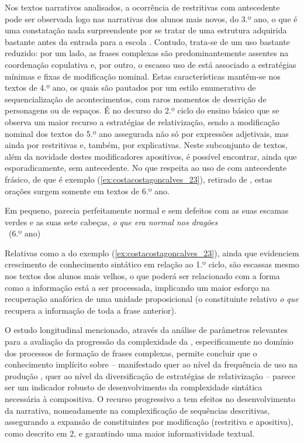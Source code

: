 \documentclass[output=paper]{LSP/langsci}
\begin{document}
Nos textos narrativos analisados, a ocorrência de  restritivas com antecedente pode ser observada logo nas narrativas dos alunos mais novos, do 3.º ano, o que é uma constatação nada surpreendente por se tratar de uma estrutura adquirida bastante antes da entrada para a escola \citep{vasconcelos1996}. Contudo, trata-se de um uso bastante reduzido: por um lado, as frases complexas são predominantemente assentes na coordenação copulativa e, por outro, o escasso uso de  está associado a estratégias mínimas e fixas de modificação nominal. Estas características mantêm-se nos textos de 4.º ano, os quais são pautados por um estilo enumerativo de sequencialização de acontecimentos, com raros momentos de descrição de personagens ou de espaços. É no decurso do 2.º ciclo do ensino básico que se observa um maior recurso a estratégias de relativização, sendo a modificação nominal dos textos do 5.º ano assegurada não só por expressões adjetivais, mas ainda por  restritivas e, também, por explicativas. Neste subconjunto de textos, além da novidade destes modificadores apositivos, é possível encontrar, ainda que esporadicamente,  sem antecedente. No que respeita ao uso de  com antecedente frásico, de que é exemplo (\ref{ex:costacostagoncalves_23}), retirado de \citet[310]{costagoncalves2010}, estas orações surgem somente em textos de 6.º ano.

\ea\label{ex:costacostagoncalves_23} 	Em pequeno, parecia perfeitamente normal e sem defeitos com as suas escamas verdes e as suas sete cabeças, \textit{o que era normal nos dragões}\\~\hfill(6.º ano)\z

Relativas como a do exemplo (\ref{ex:costacostagoncalves_23}), ainda que evidenciem crescimento de conhecimento sintático em relação ao 1.º ciclo, são escassas mesmo nos textos dos alunos mais velhos, o que poderá ser relacionado com a forma como a informação está a ser processada, implicando um maior esforço na recuperação anafórica de uma unidade proposicional (o constituinte relativo \textit{o que} recupera a informação de toda a frase anterior).

O estudo longitudinal mencionado, através da análise de parâmetros relevantes para a avaliação da progressão da complexidade da , especificamente no domínio dos processos de formação de frases complexas, permite concluir que o conhecimento implícito sobre  – manifestado quer ao nível da frequência de uso na produção , quer ao nível da diversificação de estratégias de relativização – parece ser um indicador robusto de desenvolvimento da complexidade sintática necessária à  compositiva. O recurso progressivo a  tem efeitos no desenvolvimento da  narrativa, nomeadamente na complexificação de sequências descritivas, assegurando a expansão de constituintes por modificação (restritiva e apositiva), como descrito em 2, e garantindo uma maior informatividade textual.
\end{document}
